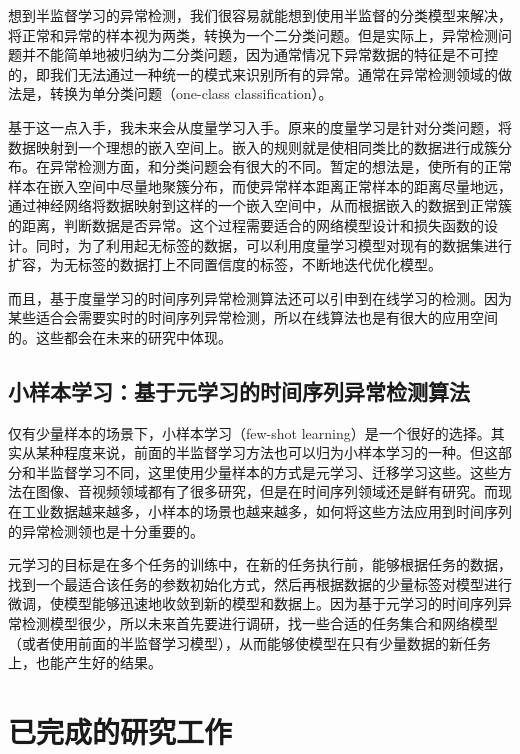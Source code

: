想到半监督学习的异常检测，我们很容易就能想到使用半监督的分类模型来解决，将正常和异常的样本视为两类，转换为一个二分类问题。但是实际上，异常检测问题并不能简单地被归纳为二分类问题，因为通常情况下异常数据的特征是不可控的，即我们无法通过一种统一的模式来识别所有的异常。通常在异常检测领域的做法是，转换为单分类问题（one-class classification）。

基于这一点入手，我未来会从度量学习入手。原来的度量学习是针对分类问题，将数据映射到一个理想的嵌入空间上。嵌入的规则就是使相同类比的数据进行成簇分布。在异常检测方面，和分类问题会有很大的不同。暂定的想法是，使所有的正常样本在嵌入空间中尽量地聚簇分布，而使异常样本距离正常样本的距离尽量地远，通过神经网络将数据映射到这样的一个嵌入空间中，从而根据嵌入的数据到正常簇的距离，判断数据是否异常。这个过程需要适合的网络模型设计和损失函数的设计。同时，为了利用起无标签的数据，可以利用度量学习模型对现有的数据集进行扩容，为无标签的数据打上不同置信度的标签，不断地迭代优化模型。

而且，基于度量学习的时间序列异常检测算法还可以引申到在线学习的检测。因为某些适合会需要实时的时间序列异常检测，所以在线算法也是有很大的应用空间的。这些都会在未来的研究中体现。

\subsection{小样本学习：基于元学习的时间序列异常检测算法}

仅有少量样本的场景下，小样本学习（few-shot learning）是一个很好的选择。其实从某种程度来说，前面的半监督学习方法也可以归为小样本学习的一种。但这部分和半监督学习不同，这里使用少量样本的方式是元学习、迁移学习这些。这些方法在图像、音视频领域都有了很多研究，但是在时间序列领域还是鲜有研究。而现在工业数据越来越多，小样本的场景也越来越多，如何将这些方法应用到时间序列的异常检测领也是十分重要的。

元学习的目标是在多个任务的训练中，在新的任务执行前，能够根据任务的数据，找到一个最适合该任务的参数初始化方式，然后再根据数据的少量标签对模型进行微调，使模型能够迅速地收敛到新的模型和数据上。因为基于元学习的时间序列异常检测模型很少，所以未来首先要进行调研，找一些合适的任务集合和网络模型（或者使用前面的半监督学习模型），从而能够使模型在只有少量数据的新任务上，也能产生好的结果。

\section{已完成的研究工作}

